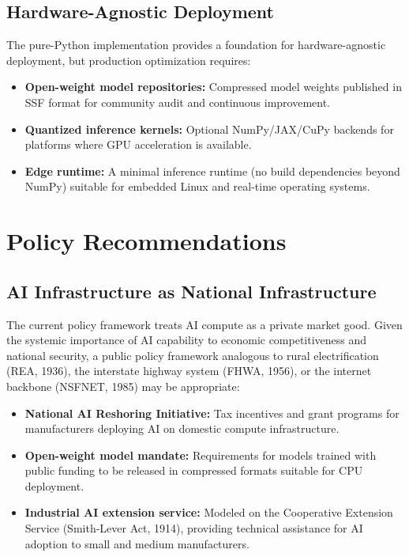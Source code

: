 \documentclass[11pt,a4paper,openright]{book}
\begin{document}
\subsection{Hardware-Agnostic Deployment}

The pure-Python implementation provides a foundation for hardware-agnostic deployment, but production optimization requires:

\begin{itemize}
	\item \textbf{Open-weight model repositories:} Compressed model weights published in SSF format for community audit and continuous improvement.
	\item \textbf{Quantized inference kernels:} Optional NumPy/JAX/CuPy backends for platforms where GPU acceleration is available.
	\item \textbf{Edge runtime:} A minimal inference runtime (no build dependencies beyond NumPy) suitable for embedded Linux and real-time operating systems.
\end{itemize}

\section{Policy Recommendations}

\subsection{AI Infrastructure as National Infrastructure}

The current policy framework treats AI compute as a private market good. Given the systemic importance of AI capability to economic competitiveness and national security, a public policy framework analogous to rural electrification (REA, 1936), the interstate highway system (FHWA, 1956), or the internet backbone (NSFNET, 1985) may be appropriate:

\begin{itemize}
	\item \textbf{National AI Reshoring Initiative:} Tax incentives and grant programs for manufacturers deploying AI on domestic compute infrastructure.
	\item \textbf{Open-weight model mandate:} Requirements for models trained with public funding to be released in compressed formats suitable for CPU deployment.
	\item \textbf{Industrial AI extension service:} Modeled on the Cooperative Extension Service (Smith-Lever Act, 1914), providing technical assistance for AI adoption to small and medium manufacturers.
\end{itemize}
\end{document}
